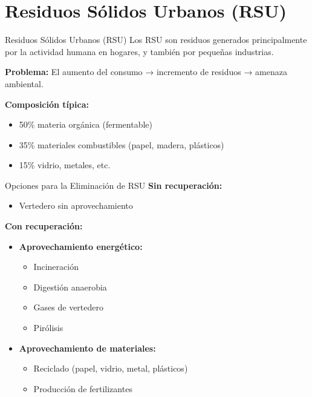 \documentclass[../../main.tex]{subfiles}
\begin{document}
\section{Residuos Sólidos Urbanos (RSU)}
\begin{frame}{Residuos Sólidos Urbanos (RSU)}
\justifying
Los RSU son residuos generados principalmente por la actividad humana en hogares, y también por pequeñas industrias.

\vspace{0.5em}
\textbf{Problema:} El aumento del consumo → incremento de residuos → amenaza ambiental.

\vspace{0.5em}
\textbf{Composición típica:}
\begin{itemize}
  \item 50\% materia orgánica (fermentable)
  \item 35\% materiales combustibles (papel, madera, plásticos)
  \item 15\% vidrio, metales, etc.
\end{itemize}
\end{frame}
\begin{frame}{Opciones para la Eliminación de RSU}
\justifying
\textbf{Sin recuperación:}
\begin{itemize}
  \item Vertedero sin aprovechamiento
\end{itemize}

\textbf{Con recuperación:}
\begin{itemize}
  \item \textbf{Aprovechamiento energético:}
    \begin{itemize}
      \item Incineración
      \item Digestión anaerobia
      \item Gases de vertedero
      \item Pirólisis
    \end{itemize}
  \item \textbf{Aprovechamiento de materiales:}
    \begin{itemize}
      \item Reciclado (papel, vidrio, metal, plásticos)
      \item Producción de fertilizantes
    \end{itemize}
\end{itemize}
\end{frame}
\end{document}
